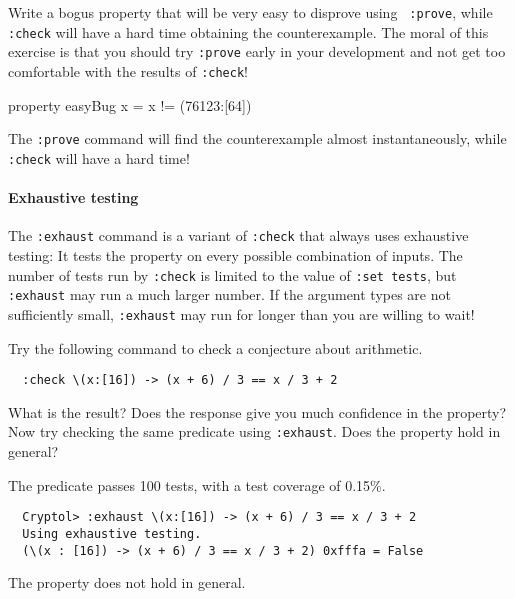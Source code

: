 \begin{Exercise}\label{ex:quick:2}
  Write a bogus property that will be very easy to disprove using {\tt
    :prove}, while {\tt :check} will have a hard time obtaining the
  counterexample.  The moral of this exercise is that you should try
  {\tt :prove} early in your development and not get too comfortable
  with the results of {\tt :check}!\indCmdProve\indCmdCheck
\end{Exercise}
\begin{Answer}
\begin{code}
  property easyBug x = x != (76123:[64])
\end{code}
The {\tt :prove} command will find the counterexample almost
instantaneously, while {\tt :check} will have a hard time!
\end{Answer}

\paragraph*{Exhaustive testing}
The \texttt{:exhaust} command is a variant of \texttt{:check} that
always uses exhaustive testing: It tests the property on every
possible combination of inputs. The number of tests run by
\texttt{:check} is limited to the value of \texttt{:set tests}, but
\texttt{:exhaust} may run a much larger number. If the argument types
are not sufficiently small, \texttt{:exhaust} may run for longer than
you are willing to wait!

\begin{Exercise}\label{ex:quick:3}
  Try the following command to check a conjecture about arithmetic.
  \begin{Verbatim}
  :check \(x:[16]) -> (x + 6) / 3 == x / 3 + 2
  \end{Verbatim}
  What is the result? Does the response give you much confidence in
  the property? Now try checking the same predicate using
  \texttt{:exhaust}. Does the property hold in general?
\end{Exercise}
\begin{Answer}
  The predicate passes 100 tests, with a test coverage of 0.15\%.
\begin{Verbatim}
  Cryptol> :exhaust \(x:[16]) -> (x + 6) / 3 == x / 3 + 2
  Using exhaustive testing.
  (\(x : [16]) -> (x + 6) / 3 == x / 3 + 2) 0xfffa = False
\end{Verbatim}
  The property does not hold in general.
\end{Answer}

